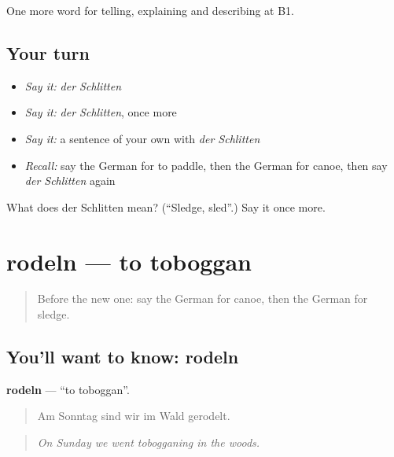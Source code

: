 \begin{grammarlens}[title={What you've built}]
One more word for telling, explaining and describing at B1.
\end{grammarlens}

\subsection*{Your turn}
\begin{itemize}
\raggedright
  \item \emph{Say it:} \emph{der Schlitten}
  \item \emph{Say it:} \emph{der Schlitten}, once more
  \item \emph{Say it:} a sentence of your own with \emph{der Schlitten}
  \item \emph{Recall:} say the German for to paddle, then the German for canoe, then say \emph{der Schlitten} again
\end{itemize}

\begin{tcolorbox}[breakable,colback=teal!4,colframe=teal!35!black,title={Before you move on}]
What does der Schlitten mean? (\textquotedblleft{}Sledge, sled\textquotedblright{}.) Say it once more.
\end{tcolorbox}
\section[rodeln]{rodeln — to toboggan}

\label{lesson:GE-C512-rodeln}



\begin{quote}
Before the new one: say the German for canoe, then the German for sledge.
\end{quote}

\subsection*{You'll want to know: rodeln}
\textbf{rodeln} — \textquotedblleft{}to toboggan\textquotedblright{}.

\begin{quote}
Am Sonntag sind wir im Wald gerodelt.
\end{quote}

\begin{quote}
\emph{On Sunday we went tobogganing in the woods.}
\end{quote}

